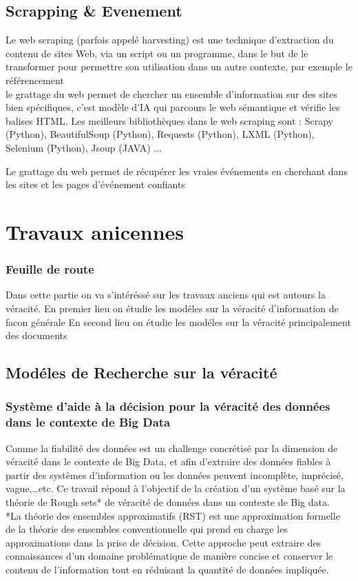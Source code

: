 \documentclass[12pt]{report}
\begin{document}
\subsection{Scrapping \& Evenement}
Le web scraping (parfois appelé harvesting) est une technique
d'extraction du contenu de sites Web, via un script ou un programme, dans
le but de le transformer pour permettre son utilisation dans un autre
contexte, par exemple le référencement \cite{45}\\
le grattage du web permet de chercher un ensemble 
d’information sur des
sites bien spécifiques, c’est modèle d’IA qui parcours 
le web sémantique et
vérifie les balises HTML.
Les meilleurs bibliothèques dans le web scraping sont :
Scrapy (Python), BeautifulSoup (Python), Requests (Python), LXML
(Python), Selenium (Python), Jsoup (JAVA) ...

Le grattage du web permet de récupérer les vraies événements 
en cherchant dans les sites et les pages d'événement 
confiants

\section{Travaux anicennes}

\subsubsection{Feuille de route}

Dans cette partie on va s’intéréssé sur les travaux anciens qui est autours la véracité. 
En premier lieu on étudie les modéles sur la véracité d’information de facon générale
En second lieu on étudie les modéles sur la véracité principalement des documents

\subsection{Modéles de Recherche sur la véracité}

\subsubsection{Système d’aide à la décision pour la véracité des données dans le contexte de Big Data}

Comme la fiabilité des données est un challenge concrétisé par la
dimension de véracité dans le contexte de Big Data, et afin d’extraire des
données fiables à partir des systèmes d’information ou les données peuvent
incomplète, imprécisé, vague,…etc. Ce travail répond à l’objectif de la
création d’un système basé sur la théorie de Rough sets* de véracité de
données dans un contexte de Big data.
\\
*La théorie des ensembles approximatifs (RST) est une approximation
formelle de la théorie des ensembles conventionnelle qui prend en charge
les approximations dans la prise de décision. Cette approche peut extraire
des connaissances d'un domaine problématique de manière concise et
conserver le contenu de l'information tout en réduisant la quantité de
données impliquée\cite{46}.\\ \\
\end{document}
